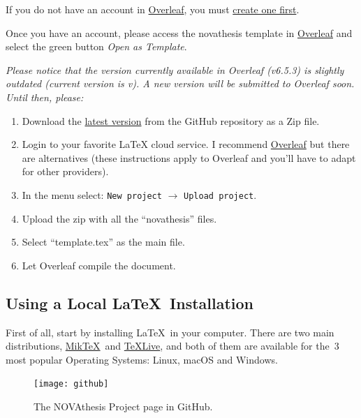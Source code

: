 If you do not have an account in \href{https://www.overleaf.com?r=f5160636&rm=d&rs=b}{Overleaf}, you must \href{https://www.overleaf.com?r=f5160636&rm=d&rs=b}{create one first}.

Once you have an account, please access the \gls{novathesis} template in \href{https://www.overleaf.com/latex/templates/new-university-of-lisbon-universidade-nova-de-lisboa-slash-unl-thesis-template/fwbztcrptjmg}{Overleaf} and select the green button \emph{Open as Template}. 

\bgroup
  \itshape
  Please notice that the version currently available in Overleaf (v6.5.3) is slightly outdated (current version is v\novathesisversion). A new version will be submitted to Overleaf soon.  Until then, please:
  \begin{enumerate}
    \item Download the \href{https://github.com/joaomlourenco/novathesis/archive/master.zip}{latest version} from the GitHub repository as a Zip file.
    \item Login to your favorite LaTeX cloud service. I recommend \href{https://www.overleaf.com/?r=f5160636&rm=d&rs=b}{Overleaf} but there are alternatives (these instructions apply to Overleaf and you'll have to adapt for other providers).
    \item In the menu select: \texttt{New project} $\rightarrow$ \texttt{Upload project}.
    \item Upload the zip with all the “novathesis” files.
    \item Select “template.tex” as the main file.
    \item Let Overleaf compile the document.
  \end{enumerate}
\egroup

\subsection{Using a Local \LaTeX\ Installation}
\label{sub:using_local_latex}

\newcommand{\MikTeX}{Mik\TeX}
\newcommand{\TeXLive}{\TeX Live}

First of all, start by installing \LaTeX\ in your computer.  There are two main distributions, \href{https://miktex.org}{\MikTeX}\ and \href{https://www.tug.org/texlive/}{\TeXLive}, and both of them are available for the~3 most popular Operating Systems: Linux, macOS and Windows.

\begin{figure}
\texttt{[image: github]}%
\caption{The NOVAthesis Project page in GitHub.}
\end{figure}

